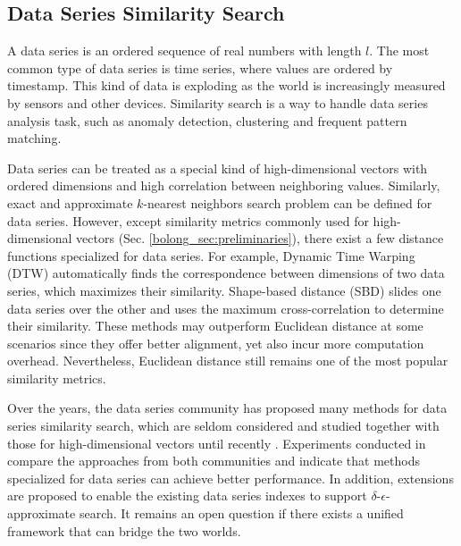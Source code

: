 \documentclass[11pt]{article}
\begin{document}
\subsection{Data Series Similarity Search}
A data series is an ordered sequence of real numbers with length $l$. The most common type of data series is time series, where values are ordered by timestamp. This kind of data is exploding as the world is increasingly measured by sensors and other devices. Similarity search is a way to handle data series analysis task, such as anomaly detection, clustering and frequent pattern matching.

Data series can be treated as a special kind of high-dimensional vectors with ordered dimensions and high correlation between neighboring values. Similarly, exact and approximate $k$-nearest neighbors search problem can be defined for data series. However, except similarity metrics commonly used for high-dimensional vectors (Sec. \ref{bolong_sec:preliminaries}), there exist a few distance functions specialized for data series. For example, Dynamic Time Warping (DTW) \cite{DBLP:conf/kdd/RakthanmanonCMBWZZK12} automatically finds the correspondence between dimensions of two data series, which maximizes their similarity. Shape-based distance (SBD) \cite{DBLP:conf/sigmod/PaparrizosG15} slides one data series over the other and uses the maximum cross-correlation to determine their similarity. These methods may outperform Euclidean distance at some scenarios since they offer better alignment, yet also incur more computation overhead. Nevertheless, Euclidean distance still remains one of the most popular similarity metrics.

Over the years, the data series community has proposed many methods for data series similarity search, which are seldom considered and studied together with those for high-dimensional vectors until recently \cite{azizi2023elpis,DBLP:journals/pvldb/EchihabiFZPB22,DBLP:journals/pvldb/ChatzakisFKPP23}. Experiments conducted in \cite{DBLP:journals/pvldb/EchihabiZPB18,DBLP:journals/pvldb/EchihabiZPB19} compare the approaches from both communities and indicate that methods specialized for data series can achieve better performance. In addition, extensions are proposed to enable the existing data series indexes to support $\delta$-$\epsilon$-approximate search. 
It remains an open question if there exists a unified framework that can bridge the two worlds. 
\end{document}
